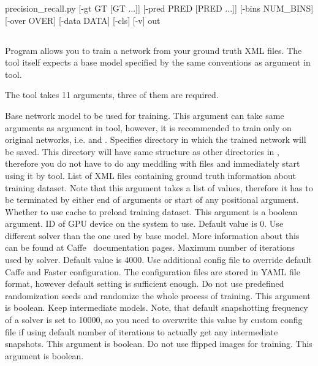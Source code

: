\begin{usage}
precision_recall.py [-gt GT [GT ...]] [-pred PRED [PRED ...]] [-bins NUM_BINS] [-over OVER] [-data DATA] [-cls] [-v] out
\end{usage}

\subsection{} \label{tr}
Program  allows you to train a network from your ground truth XML files. The tool itself expects a base model specified by the same conventions as argument  in \hyperref[rec]{} tool.

The tool takes 11 arguments, three of them are required.
\begin{description}
 Base network model to be used for training. This argument can take same arguments as argument  in  tool, however, it is recommended to train only on original networks, i.e.  and .
 Specifies directory in which the trained network will be saved. This directory will have same structure as other directories in , therefore you do not have to do any meddling with files and immediately start using it by  tool.
 List of XML files containing ground truth information about training dataset. Note that this argument takes a list of values, therefore it has to be terminated by either end of arguments or start of any positional argument.
 Whether to use cache to preload training dataset. This argument is a boolean argument.
 ID of GPU device on the system to use. Default value is 0.
 Use different solver than the one used by base model. More information about this can be found at Caffe~\cite{caffe} documentation pages.
 Maximum number of iterations used by solver. Default value is 4000.
 Use additional config file to override default Caffe and Faster \rcnn configuration. The configuration files are stored in YAML file format, however default setting is sufficient enough.
 Do not use predefined randomization seeds and randomize the whole process of training. This argument is boolean.
 Keep intermediate models. Note, that default snapshotting frequency of a solver is set to 10000, so you need to overwrite this value by custom config file if using default number of iterations to actually get any intermediate snapshots. This argument is boolean.
 Do not use flipped images for training. This argument is boolean.
\end{description}

